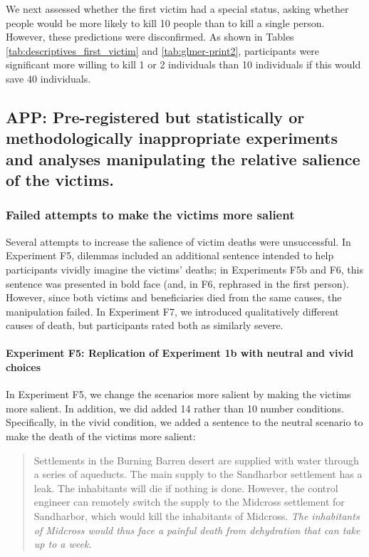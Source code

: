 \documentclass[
]{article}
\begin{document}
We next assessed whether the first victim had a special status, asking whether people would be more likely to kill 10 people than to kill a single person. However, these predictions were disconfirmed. As shown in Tables \ref{tab:descriptives_first_victim} and \ref{tab:glmer-print2}, participants were significant more willing to kill 1 or 2 individuals than 10 individuals if this would save 40 individuals.

\clearpage

\subsection{APP: Pre-registered but statistically or methodologically inappropriate experiments and analyses manipulating the relative salience of the victims.}\label{app-pre-registered-but-statistically-or-methodologically-inappropriate-experiments-and-analyses-manipulating-the-relative-salience-of-the-victims.}

\subsubsection{Failed attempts to make the victims more salient}\label{app:failed-vivacity-manipulations}

Several attempts to increase the salience of victim deaths were unsuccessful. In Experiment F5, dilemmas included an additional sentence intended to help participants vividly imagine the victims' deaths; in Experiments F5b and F6, this sentence was presented in bold face (and, in F6, rephrased in the first person). However, since both victims and beneficiaries died from the same causes, the manipulation failed. In Experiment F7, we introduced qualitatively different causes of death, but participants rated both as similarly severe.

\paragraph{Experiment F5: Replication of Experiment 1b with neutral and vivid choices}\label{experiment-f5-replication-of-experiment-1b-with-neutral-and-vivid-choices}

In Experiment F5, we change the scenarios more salient by making the victims more salient. In addition, we did added 14 rather than 10 number conditions. Specifically, in the vivid condition, we added a sentence to the neutral scenario to make the death of the victims more salient:

\begin{quote}
Settlements in the Burning Barren desert are supplied with water through a series of aqueducts. The main supply to the Sandharbor settlement has a leak. The inhabitants will die if nothing is done. However, the control engineer can remotely switch the supply to the Midcross settlement for Sandharbor, which would kill the inhabitants of Midcross.
\emph{The inhabitants of Midcross would thus face a painful death from dehydration that can take up to a week.}
\end{quote}
\end{document}
